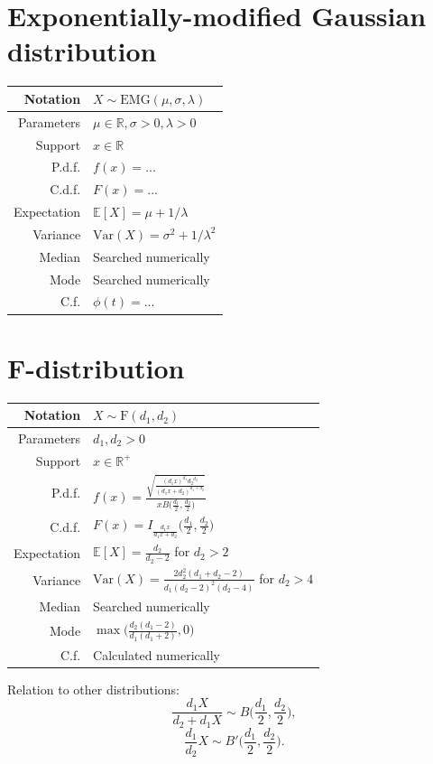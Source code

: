 \documentclass[a4paper,11pt]{article}
\theoremstyle{plain}
\theoremstyle{definition}
\newcommand{\ME}{\mathbb{E}}
\newcommand{\MR}{\mathbb{R}}
\newcommand{\Var}{\mathrm{Var}}
\begin{document}
	\section{Exponentially-modified Gaussian distribution}
	\begin{center}
		\begin{tabular}{| r | l |}
			\hline
			Notation & $X \sim \mathrm{EMG}(\mu, \sigma, \lambda)$ \\
			\hline
			Parameters & $\mu \in \MR, \sigma > 0, \lambda > 0$ \\
			\hline
			Support & $x \in \MR$  \\
			\hline
			P.d.f. & $f(x) = ...  $ \\
			\hline
			C.d.f. & $F(x)=... $\\
			\hline
			Expectation & $\ME[X] = \mu + 1 / \lambda$ \\
			\hline
			Variance & $\Var(X) = \sigma^2 + 1/\lambda^2$ \\
			\hline
			Median & Searched numerically \\
			\hline
			Mode & Searched numerically \\
			\hline
			C.f. & $\phi(t) = ... $ \\
			\hline
		\end{tabular}
	\end{center}
	\section{F-distribution}
		\begin{center}
			\begin{tabular}{| r | l |}
				\hline
				Notation & $X \sim \mathrm{F}(d_1, d_2)$ \\
				\hline
				Parameters & $d_1, d_2 > 0$ \\
				\hline
				Support & $x \in \MR^+$  \\
				\hline
				P.d.f. & $f(x) = \frac{\sqrt{\frac{(d_1 x)^{d_1} {d_2}^{d_2} }{(d_1x+d_2)^{d_1+d_2}}}}{x B\Big(\frac{d_1}{2},\frac{d_2}{2}\Big)}  $ \\
				\hline
				C.d.f. & $F(x)= I_{\frac{d_1x}{d_1x+d_2}}\Big(\frac{d_1}{2},\frac{d_2}{2}\Big) $\\
				\hline
				Expectation & $\ME[X] = \frac{d_2}{d_2-2}$ for $ d_2 > 2 $ \\
				\hline
				Variance & $\Var(X) = \frac{2d_2^2(d_1+d_2-2)}{d_1(d_2-2)^2(d_2-4)}$ for $d_2 > 4$ \\
				\hline
				Median & Searched numerically \\
				\hline
				Mode & $\max\Big(\frac{d_2(d_1-2)}{d_1(d_1+2)}, 0\Big)$ \\
				\hline
				C.f. & Calculated numerically \\
				\hline
			\end{tabular}
		\end{center}
		Relation to other distributions:
		\[
		\frac{d_1X}{d_2 + d_1X} \sim B\bigg(\frac{d_1}{2}, \frac{d_2}{2} \bigg),
		\]
		\[
		\frac{d_1}{d_2}X \sim B'\bigg(\frac{d_1}{2}, \frac{d_2}{2} \bigg).
		\]
		
\end{document}
